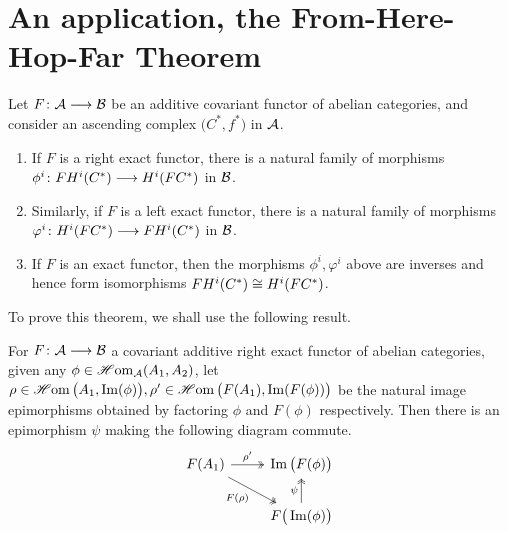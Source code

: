 \documentclass[a4paper]{article}
\begin{document}
\section{An application, the From-Here-Hop-Far Theorem}
\begin{Theorem}
    Let $F\colon\mathcal{A}\longrightarrow \mathcal{B}$ be an additive covariant functor of abelian categories, and consider an ascending complex $\big(C^{*}, f^*\big)$ in $\mathcal{A}$.
    \begin{enumerate}
        \item If $F$ is a right exact functor, there is a natural family of morphisms $\phi^i\colon FH^{i}(C^{*})\longrightarrow H^{i}(FC^{*})$ in $\mathcal{B}$.
        \item Similarly, if $F$ is a left exact functor, there is a natural family of morphisms $\varphi^i\colon H^{i}(FC^{*})\longrightarrow FH^{i}(C^{*})$ in $\mathcal{B}$. 
        \item If $F$ is an exact functor, then the morphisms $\phi^i, \varphi^i$ above are inverses and hence form isomorphisms ${FH^{i}(C^{*})} \cong {H^{i}(FC^{*})}$.
    \end{enumerate}
\end{Theorem}
To prove this theorem, we shall use the following result.
\begin{Lemma}
    For $F\colon\mathcal{A}\longrightarrow \mathcal{B}$ a covariant additive right exact functor of abelian categories, given any $\phi \in \operatorname{\mathscr{H}om}_{\mathcal{A}}(A_1,A_2)$, let $\rho \in \operatorname{\mathscr{H}om}\big(A_1, \operatorname{Im}(\phi)\big), \rho' \in \operatorname{\mathscr{H}om}\big(F(A_1), \operatorname{Im}(F(\phi))\big)$ be the natural image epimorphisms obtained by factoring $\phi$ and $F(\phi)$ respectively. Then there is an epimorphism $\psi$ making the following diagram commute. %
    \[
        \begin{tikzcd}
            F(A_1) \arrow[r, "\rho'", two heads] \arrow[rd, "F(\rho)"', two heads] & \im\big(F(\phi)\big) \\
            & F\big(\im(\phi)\big) \arrow[u, "\psi", two heads]
        \end{tikzcd}
    \]
\end{Lemma}
\end{document}
